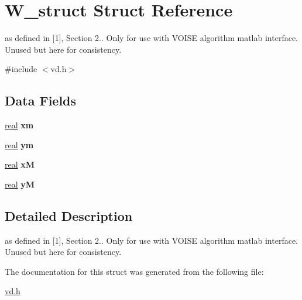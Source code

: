 \hypertarget{structW__struct}{}\section{W\+\_\+struct Struct Reference}
\label{structW__struct}


as defined in \mbox{[}1\mbox{]}, Section 2.. Only for use with V\+O\+I\+SE algorithm matlab interface. Unused but here for consistency.  




{\ttfamily \#include $<$vd.\+h$>$}

\subsection*{Data Fields}
\begin{DoxyCompactItemize}
\item 
\mbox{\label{structW__struct_a7c0ed763a5701a0787361a68cad4aec4}} 
\mbox{\hyperlink{typedefs_8cpp_a58a0c7cf2501f4492da833421be92547}{real}} {\bfseries xm}
\item 
\mbox{\label{structW__struct_a69290893bf3fc1a9bf0ff987a9e25320}} 
\mbox{\hyperlink{typedefs_8cpp_a58a0c7cf2501f4492da833421be92547}{real}} {\bfseries ym}
\item 
\mbox{\label{structW__struct_a20e12df215aaa6a737a15b05e6102093}} 
\mbox{\hyperlink{typedefs_8cpp_a58a0c7cf2501f4492da833421be92547}{real}} {\bfseries xM}
\item 
\mbox{\label{structW__struct_a10de004bf31c6563ad0a55116a96cd8d}} 
\mbox{\hyperlink{typedefs_8cpp_a58a0c7cf2501f4492da833421be92547}{real}} {\bfseries yM}
\end{DoxyCompactItemize}


\subsection{Detailed Description}
as defined in \mbox{[}1\mbox{]}, Section 2.. Only for use with V\+O\+I\+SE algorithm matlab interface. Unused but here for consistency. 

The documentation for this struct was generated from the following file\+:\begin{DoxyCompactItemize}
\item 
\mbox{\hyperlink{vd_8h}{vd.\+h}}\end{DoxyCompactItemize}
